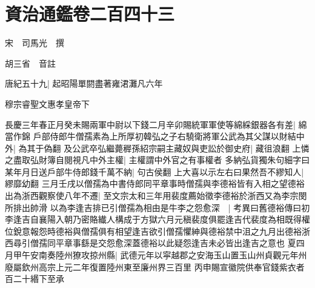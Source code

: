 \chapter{資治通鑑卷二百四十三}
宋　司馬光　撰

胡三省　音註

唐紀五十九|{
	起昭陽單閼盡著雍涒灘凡六年}


穆宗睿聖文惠孝皇帝下

長慶三年春正月癸未賜兩軍中尉以下錢二月辛卯賜統軍軍使等綿綵銀器各有差|{
	綿當作錦}
戶部侍郎牛僧孺素為上所厚初韓弘之子右驍衛將軍公武為其父謀以財結中外|{
	為其于偽翻}
及公武卒弘繼薨稺孫紹宗嗣主藏奴與吏訟於御史府|{
	藏徂浪翻}
上憐之盡取弘財簿自閱視凡中外主權|{
	主權謂中外官之有事權者}
多納弘貨獨朱句細字曰某年月日送戶部牛侍郎錢千萬不納|{
	句古侯翻}
上大喜以示左右曰果然吾不繆知人|{
	繆靡幼翻}
三月壬戌以僧孺為中書侍郎同平章事時僧孺與李德裕皆有入相之望德裕出為浙西觀察使八年不遷|{
	至文宗太和三年用裴度薦始徵李德裕於浙西又為李宗閔所排出帥滑}
以為李逢吉排已引僧孺為相由是牛李之怨愈深　|{
	考異曰舊德裕傳曰初李逢吉自襄陽入朝乃密賂纎人構成于方獄六月元稹裴度俱罷逢吉代裴度為相既得權位銳意報怨時德裕與僧孺俱有相望逢吉欲引僧孺懼紳與德裕禁中沮之九月出德裕浙西尋引僧孺同平章事繇是交怨愈深蓋德裕以此疑怨逢吉未必皆出逢吉之意也}
夏四月甲午安南奏陸州獠攻掠州縣|{
	武德元年以寜越郡之安海玉山置玉山州貞觀元年州廢屬欽州高宗上元二年復置陸州東至廉州界三百里}
丙申賜宣徽院供奉官錢紫衣者百二十緡下至承

